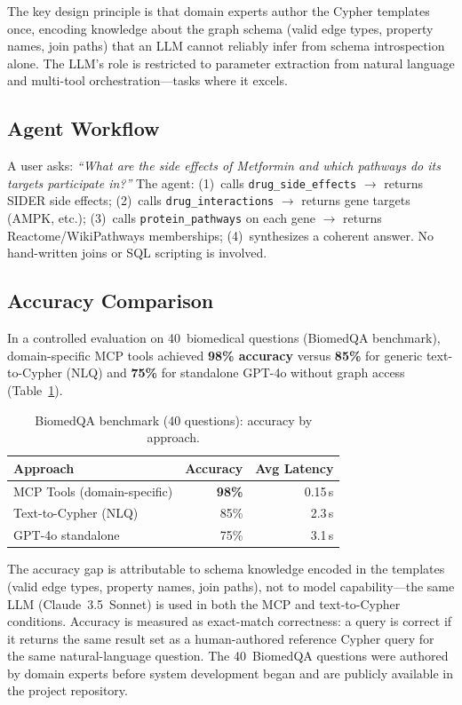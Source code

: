 \documentclass[runningheads]{llncs}
\begin{document}
The key design principle is that domain experts author the Cypher
templates once, encoding knowledge about the graph schema (valid
edge types, property names, join paths) that an LLM cannot reliably
infer from schema introspection alone.  The LLM's role is
restricted to parameter extraction from natural language and
multi-tool orchestration---tasks where it excels.

\subsection{Agent Workflow}

A user asks: \emph{``What are the side effects of Metformin and
which pathways do its targets participate in?''}  The agent:
(1)~calls \texttt{drug\_side\_effects} $\to$ returns SIDER side
effects; (2)~calls \texttt{drug\_interactions} $\to$ returns gene
targets (AMPK, etc.); (3)~calls \texttt{protein\_pathways} on
each gene $\to$ returns Reactome/WikiPathways memberships;
(4)~synthesizes a coherent answer.  No hand-written joins or
SQL scripting is involved.

\subsection{Accuracy Comparison}

In a controlled evaluation on 40~biomedical questions
(BiomedQA benchmark), domain-specific MCP tools achieved
\textbf{98\% accuracy} versus \textbf{85\%} for generic
text-to-Cypher (NLQ) and \textbf{75\%} for standalone GPT-4o
without graph access (Table~\ref{tab:mcp}).

\begin{table}[t]
\centering
\caption{BiomedQA benchmark (40 questions): accuracy by approach.}
\label{tab:mcp}
\small
\begin{tabular}{@{}lrr@{}}
\toprule
\textbf{Approach} & \textbf{Accuracy} & \textbf{Avg Latency} \\
\midrule
MCP Tools (domain-specific)  & \textbf{98\%} & 0.15\,s \\
Text-to-Cypher (NLQ)         & 85\%          & 2.3\,s \\
GPT-4o standalone            & 75\%          & 3.1\,s \\
\bottomrule
\end{tabular}
\end{table}

The accuracy gap is attributable to schema knowledge encoded in the
templates (valid edge types, property names, join paths), not to
model capability---the same LLM (Claude~3.5~Sonnet) is used in both
the MCP and text-to-Cypher conditions.  Accuracy is measured as
exact-match correctness: a query is correct if it returns the same
result set as a human-authored reference Cypher query for the same
natural-language question.  The 40~BiomedQA questions were authored
by domain experts before system development began and are publicly
available in the project repository.
\end{document}
